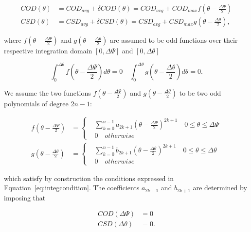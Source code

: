 \documentclass[review]{elsarticle}
\begin{document}
\begin{equation}
\begin{aligned}
COD\left(\theta\right)&=COD_{avg}+\delta COD\left(\theta\right)=COD_{avg}+COD_{max}f\left(\theta-\frac{\Delta\Psi}{2}\right)\\
CSD\left(\theta\right)&=CSD_{avg}+\delta CSD\left(\theta\right)=CSD_{avg}+CSD_{max}g\left(\theta-\frac{\Delta\theta}{2}\right),
\end{aligned}
\end{equation}

where $f\left(\theta-\frac{\Delta\Psi}{2}\right)$ and $g\left(\theta-\frac{\Delta\theta}{2}\right)$ are assumed to be odd functions over their respective integration domain $\left[0,\Delta\Psi\right]$ and $\left[0,\Delta\theta\right]$

\begin{equation}\label{eq:integcondition}
\int_{0}^{\Delta\theta}f\left(\theta-\frac{\Delta\Psi}{2}\right)d\theta=0\quad\int_{0}^{\Delta\theta}g\left(\theta-\frac{\Delta\theta}{2}\right)d\theta=0.
\end{equation}

We assume the two functions $f\left(\theta-\frac{\Delta\Psi}{2}\right)$ and $g\left(\theta-\frac{\Delta\theta}{2}\right)$ to be two odd polynomials of degree $2n-1$:

\begin{equation}
\begin{aligned}
f\left(\theta-\frac{\Delta\Psi}{2}\right)&=
\begin{cases}
&\sum_{k=0}^{n-1}a_{2k+1}\left(\theta-\frac{\Delta\Psi}{2}\right)^{2k+1}\quad0\leq\theta\leq\Delta\Psi\\
&0\quad otherwise
\end{cases}\\
g\left(\theta-\frac{\Delta\theta}{2}\right)&=
\begin{cases}
&\sum_{k=0}^{n-1}b_{2k+1}\left(\theta-\frac{\Delta\theta}{2}\right)^{2k+1}\quad0\leq\theta\leq\Delta\theta\\
&0\quad otherwise
\end{cases}
\end{aligned}
\end{equation}

which satisfy by construction the conditions expressed in Equation~\ref{eq:integcondition}. The coefficients $a_{2k+1}$ and $b_{2k+1}$ are determined by imposing that

\begin{equation}
\begin{aligned}
COD\left(\Delta\Psi\right)&=0\\
CSD\left(\Delta\theta\right)&=0.
\end{aligned}
\end{equation}
\end{document}
